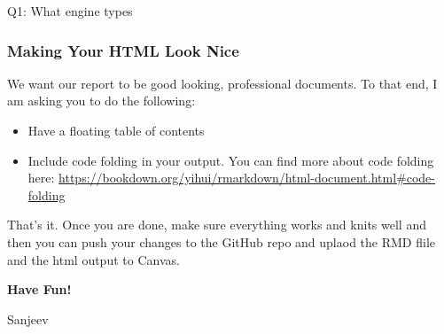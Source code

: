 \documentclass[
]{article}
\begin{document}
Q1: What engine types

\hypertarget{making-your-html-look-nice}{%
\subsubsection{Making Your HTML Look
Nice}\label{making-your-html-look-nice}}

We want our report to be good looking, professional documents. To that
end, I am asking you to do the following:

\begin{itemize}
\item
  Have a floating table of contents
\item
  Include code folding in your output. You can find more about code
  folding here:
  \url{https://bookdown.org/yihui/rmarkdown/html-document.html\#code-folding}
\end{itemize}

That's it. Once you are done, make sure everything works and knits well
and then you can push your changes to the GitHub repo and uplaod the RMD
flile and the html output to Canvas.

\textbf{Have Fun!}

Sanjeev
\end{document}
